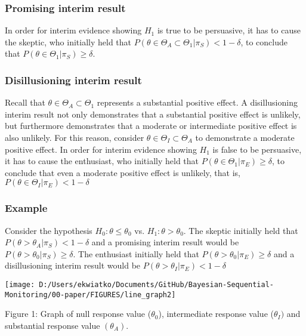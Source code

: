 \documentclass[12pt]{article}
\begin{document}
\subsubsection*{Promising interim result}
In order for interim evidence showing $H_1$ is true to be persuasive, it has to cause the skeptic, who initially held that $P(\theta\in\Theta_A\subset\Theta_1| \pi_{S})<1-\delta$, to conclude that $P(\theta\in\Theta_1| \pi_{S})\geq\delta$.
\subsubsection*{Disillusioning interim result}
Recall that $\theta\in\Theta_A\subset\Theta_1$ represents a substantial positive effect. A disillusioning interim result not only demonstrates that a substantial positive effect is unlikely, but furthermore demonstrates that a moderate or intermediate positive effect is also unlikely. For this reason, consider $\theta\in\Theta_I\subset\Theta_A$ to demonstrate a moderate positive effect. In order for interim evidence showing $H_1$ is false to be persuasive, it has to cause the enthusiast, who initially held that $P(\theta\in\Theta_1| \pi_{E})\geq\delta$, to conclude that even a moderate positive effect is unlikely, that is, $P(\theta\in\Theta_I| \pi_{E})<1-\delta$

\subsubsection*{Example}
Consider the hypothesis $H_0:\theta\leq\theta_0$ vs. $H_1:\theta>\theta_0$. The skeptic initially held that $P(\theta>\theta_A| \pi_{S})<1-\delta$ and a promising interim result would be $P(\theta>\theta_0| \pi_{S})\geq\delta$. The enthusiast initially held that $P(\theta>\theta_0| \pi_{E})\geq\delta$ and a disillusioning interim result would be $P(\theta>\theta_I| \pi_{E})<1-\delta$

\begin{center}
\texttt{[image: D:/Users/ekwiatko/Documents/GitHub/Bayesian-Sequential-Monitoring/00-paper/FIGURES/line\_graph2]}

Figure 1: Graph of null response value ($\theta_0$), intermediate response value ($\theta_I)$ and substantial response value $(\theta_A)$.
\end{center}
\end{document}
